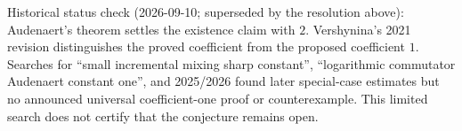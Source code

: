 \documentclass[11pt,a4paper]{article}
\begin{document}
Historical status check (2026-09-10; superseded by the resolution
above): Audenaert's theorem settles the existence claim with \(2\).
Vershynina's 2021 revision distinguishes the proved coefficient from the
proposed coefficient \(1\). Searches for ``small incremental mixing
sharp constant'', ``logarithmic commutator Audenaert constant one'', and
2025/2026 found later special-case estimates but no announced universal
coefficient-one proof or counterexample. This limited search does not
certify that the conjecture remains open.
\end{document}
